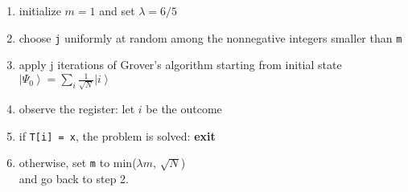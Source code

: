 \documentclass[11pt]{article}
\providecommand{\tightlist}{%
      \setlength{\itemsep}{0pt}\setlength{\parskip}{0pt}}
\begin{document}
\begin{enumerate}
\def\labelenumi{\arabic{enumi}.}
\tightlist
\item
  initialize \(m = 1\) and set \(\lambda = 6/5\)
\item
  choose \texttt{j} uniformly at random among the nonnegative integers
  smaller than \texttt{m}
\item
  apply j iterations of Grover's algorithm starting from initial state
  \(\left|\Psi_0\right\rangle = \sum_i \frac{1}{\sqrt{N}}\left|i\right\rangle\)
\item
  observe the register: let \(i\) be the outcome
\item
  if \texttt{T{[}i{]}\ =\ x}, the problem is solved: \textbf{exit}
\item
  otherwise, set \texttt{m} to min(\(\lambda m\), \(\sqrt{N}\))\\
  and go back to step 2.
\end{enumerate}
\end{document}
